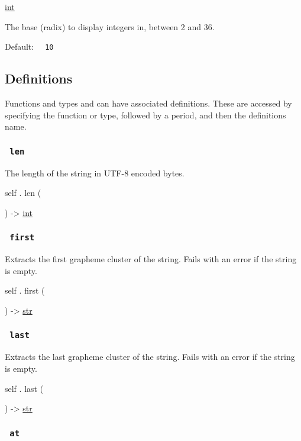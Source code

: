\href{/docs/reference/foundations/int/}{int}

The base (radix) to display integers in, between 2 and 36.

Default: \texttt{\ }{\texttt{\ 10\ }}\texttt{\ }

\subsection{\texorpdfstring{{ Definitions
}}{ Definitions }}\label{definitions}

\label{definitions-tooltip}
Functions and types and can have associated definitions. These are
accessed by specifying the function or type, followed by a period, and
then the definition\textquotesingle s name.

\subsubsection{\texorpdfstring{\texttt{\ len\ }}{ len }}\label{definitions-len}

The length of the string in UTF-8 encoded bytes.

self { . } { len } (

) -\textgreater{} \href{/docs/reference/foundations/int/}{int}

\subsubsection{\texorpdfstring{\texttt{\ first\ }}{ first }}\label{definitions-first}

Extracts the first grapheme cluster of the string. Fails with an error
if the string is empty.

self { . } { first } (

) -\textgreater{} \href{/docs/reference/foundations/str/}{str}

\subsubsection{\texorpdfstring{\texttt{\ last\ }}{ last }}\label{definitions-last}

Extracts the last grapheme cluster of the string. Fails with an error if
the string is empty.

self { . } { last } (

) -\textgreater{} \href{/docs/reference/foundations/str/}{str}

\subsubsection{\texorpdfstring{\texttt{\ at\ }}{ at }}\label{definitions-at}

